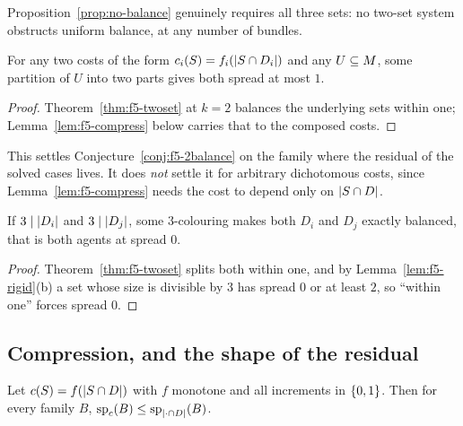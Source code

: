 \begin{corollary}
\label{cor:f5-threeneeded}
Proposition~\ref{prop:no-balance} genuinely requires all three sets: no two-set
system obstructs uniform balance, at any number of bundles.
\end{corollary}

\begin{corollary}
\label{cor:f5-2balance-composed}
For any two costs of the form $c_i(S) = f_i(\left\lvert S \cap D_i\right\rvert)$ and any
$U \subseteq M$, some partition of $U$ into two parts gives both spread at
most $1$.
\end{corollary}

\begin{proof}
Theorem~\ref{thm:f5-twoset} at $k = 2$ balances the underlying sets within one;
Lemma~\ref{lem:f5-compress} below carries that to the composed costs.
\end{proof}

This settles Conjecture~\ref{conj:f5-2balance} on the family where the residual
of the solved cases lives. It does \emph{not} settle it for arbitrary
dichotomous costs, since Lemma~\ref{lem:f5-compress} needs the cost to depend
only on $\left\lvert S \cap D\right\rvert$.

\begin{corollary}
\label{cor:f5-twozero}
If $3 \mid \left\lvert D_i\right\rvert$ and $3 \mid \left\lvert D_j\right\rvert$, some $3$-colouring makes both
$D_i$ and $D_j$ exactly balanced, that is both agents at spread $0$.
\end{corollary}

\begin{proof}
Theorem~\ref{thm:f5-twoset} splits both within one, and by
Lemma~\ref{lem:f5-rigid}(b) a set whose size is divisible by $3$ has spread $0$
or at least $2$, so ``within one'' forces spread $0$.
\end{proof}

\subsection{Compression, and the shape of the residual}
\label{sec:f5-compress}

\begin{lemma}[Compression]
\label{lem:f5-compress}
Let $c(S) = f(\left\lvert S \cap D\right\rvert)$ with $f$ monotone and all increments in
$\left\{0,1\right\}$. Then for every family $B$,
$\mathrm{sp}_{c}(B) \le \mathrm{sp}_{\left\lvert\cdot \cap D\right\rvert}(B)$.
\end{lemma}


